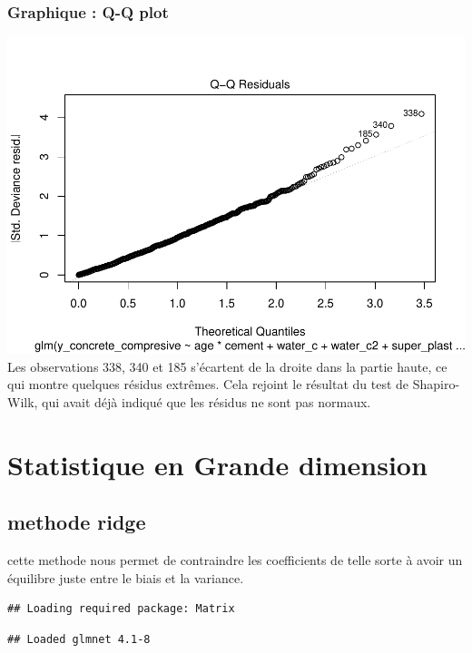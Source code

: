 \documentclass[
  12pt,
]{article}
\begin{document}
\subsubsection{Graphique : Q-Q plot}\label{graphique-q-q-plot}

\includegraphics{rmd_final_files/figure-latex/unnamed-chunk-61-1.pdf}
Les observations 338, 340 et 185 s'écartent de la droite dans la partie
haute, ce qui montre quelques résidus extrêmes. Cela rejoint le résultat
du test de Shapiro-Wilk, qui avait déjà indiqué que les résidus ne sont
pas normaux.

\section{Statistique en Grande
dimension}\label{statistique-en-grande-dimension}

\subsection{methode ridge}\label{methode-ridge}

cette methode nous permet de contraindre les coefficients de telle sorte
à avoir un équilibre juste entre le biais et la variance.

\begin{verbatim}
## Loading required package: Matrix
\end{verbatim}

\begin{verbatim}
## Loaded glmnet 4.1-8
\end{verbatim}
\end{document}

